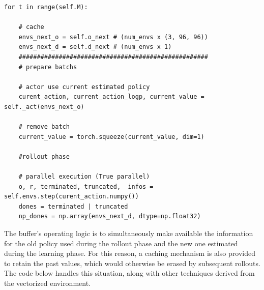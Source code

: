 \documentclass[main.tex]{subfiles}
\begin{document}
\begin{listing}[H]
	\centering
	\caption{Roll-out procedure} 
	\label{codice:rollout_1}
	\begin{verbatim}
for t in range(self.M):

	# cache
	envs_next_o = self.o_next # (num_envs x (3, 96, 96))
	envs_next_d = self.d_next # (num_envs x 1)
	####################################################
	# prepare batchs
	
	# actor use current estimated policy
	curent_action, current_action_logp, current_value = self._act(envs_next_o)
	
	# remove batch 
	current_value = torch.squeeze(current_value, dim=1)
	
	#rollout phase
	
	# parallel execution (True parallel)
	o, r, terminated, truncated,  infos = self.envs.step(curent_action.numpy())
	dones = terminated | truncated
	np_dones = np.array(envs_next_d, dtype=np.float32)
	\end{verbatim}
\end{listing}

The buffer's operating logic is to simultaneously make available the information for the old policy used during the rollout phase and the new one estimated during the learning phase. For this reason, a caching mechanism is also provided to retain the past values, which would otherwise be erased by subsequent rollouts. The code below handles this situation, along with other techniques derived from the vectorized environment.
\end{document}
